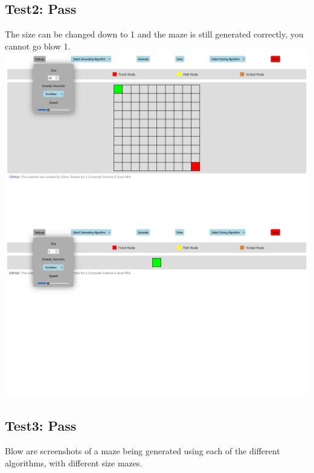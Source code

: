 \documentclass[titlepage]{article}
\begin{document}
\subsection{Test2: Pass}
The size can be changed down to 1 and the maze is still generated correctly, you cannot go blow 1.
\newline
\includegraphics[width=\linewidth]{assets/testing/test2a.jpg}
\includegraphics[width=\linewidth]{assets/testing/test2b.jpg}

\subsection{Test3: Pass}
Blow are screenshots of a maze being generated using each of the different algorithms, with different size mazes.
\end{document}
